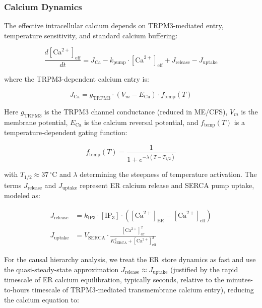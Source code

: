 \subsubsection{Calcium Dynamics}

The effective intracellular calcium depends on TRPM3-mediated entry, temperature sensitivity, and standard calcium buffering:

\begin{equation}
\label{eq:calcium-dynamics}
\frac{d[\text{Ca}^{2+}]_{\text{eff}}}{dt} = J_{\text{Ca}} - k_{\text{pump}} \cdot [\text{Ca}^{2+}]_{\text{eff}} + J_{\text{release}} - J_{\text{uptake}}
\end{equation}

where the TRPM3-dependent calcium entry is:

\begin{equation}
\label{eq:trpm3-calcium}
J_{\text{Ca}} = g_{\text{TRPM3}} \cdot (V_m - E_{\text{Ca}}) \cdot f_{\text{temp}}(T)
\end{equation}

Here $g_{\text{TRPM3}}$ is the TRPM3 channel conductance (reduced in ME/CFS), $V_m$ is the membrane potential, $E_{\text{Ca}}$ is the calcium reversal potential, and $f_{\text{temp}}(T)$ is a temperature-dependent gating function:

\begin{equation}
\label{eq:trpm3-temperature}
f_{\text{temp}}(T) = \frac{1}{1 + e^{-\lambda(T - T_{1/2})}}
\end{equation}

with $T_{1/2} \approx 37\,{}^{\circ}\text{C}$ and $\lambda$ determining the steepness of temperature activation. The terms $J_{\text{release}}$ and $J_{\text{uptake}}$ represent ER calcium release and SERCA pump uptake, modeled as:

\begin{align}
\label{eq:calcium-stores}
J_{\text{release}} &= k_{\text{IP3}} \cdot [\text{IP}_3] \cdot ([\text{Ca}^{2+}]_{\text{ER}} - [\text{Ca}^{2+}]_{\text{eff}}) \\
J_{\text{uptake}} &= V_{\text{SERCA}} \cdot \frac{[\text{Ca}^{2+}]_{\text{eff}}^2}{K_{\text{SERCA}}^2 + [\text{Ca}^{2+}]_{\text{eff}}^2}
\end{align}

For the causal hierarchy analysis, we treat the ER store dynamics as fast and use the quasi-steady-state approximation $J_{\text{release}} \approx J_{\text{uptake}}$ (justified by the rapid timescale of ER calcium equilibration, typically seconds, relative to the minutes-to-hours timescale of TRPM3-mediated transmembrane calcium entry), reducing the calcium equation to:

